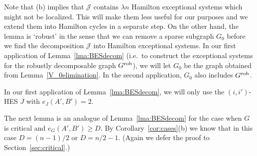 \documentclass{memo-l}
\def\COMMENT#1{}
\numberwithin{section}{chapter}
\numberwithin{equation}{section}
\numberwithin{firstthm}{section}
\numberwithin{figure}{section}
\begin{document}
Note that (b) implies that $\mathcal{J}$ contains $\lambda n$ Hamilton exceptional systems which might not be localized.
This will make them less useful for our purposes and we extend them into Hamilton cycles in a separate step.
On the other hand, the lemma is `robust' in the sense that we can remove a sparse subgraph $G_0$ before we find the decomposition $\mathcal{J}$
into Hamilton exceptional systems. In our first application of Lemma~\ref{lma:BESdecom} (i.e.~to construct the
exceptional systems for the robustly decomposable graph $G^{\rm rob}$),
we will let $G_0$ be the graph obtained from Lemma~\ref{V_0elimination}.
In the second application, $G_0$ also includes $G^{\rm rob}$.%
     \COMMENT{Also, note that $G_0$ is not assumed to be regular.} 
In our first application of Lemma~\ref{lma:BESdecom}, we will only use the
$(i,i')$-HES $J$ with $e_J(A',B') =2$.

The next lemma is an analogue of Lemma~\ref{lma:BESdecom} for the case when $G$ is critical and $e_G(A',B') \ge D$.
By Corollary~\ref{cor:cases}(b) we know that in this case $D = (n-1)/2$ or $D = n/2-1$.
(Again we defer the proof to Section~\ref{sec:critical}.)
\end{document}
